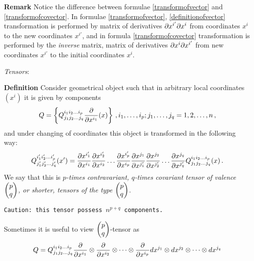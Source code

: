 \documentclass[12pt]{article}
\theoremstyle{theorem}
\numberwithin{equation}{section}
\begin{document}
{\bf Remark}  Notice the difference between formulae
\eqref{transformofvector} and \eqref{transformofcovector}.
In formulae \eqref{transformofvector}, \eqref{definitionofvector} 
transformation is performed
by matrix of derivatives ${\partial x^{i'}\partial x^i}$ from coordinates
    $x^i$ to the new coordinates $x^{i'}$, and
in formula \eqref{transformofcovector} transformation is performed
by the {\it inverse }matrix, matrix  of derivatives ${\partial x^{i}\partial x^{i'}}$ 
from new coordinates
    $x^{i'}$ to the initial coordinates $x^{i}$.

\m


          {\it Tensors}:




\smallskip

{\bf Definition}  
   Consider geometrical object
    such that in arbitrary local coordinates
   $(x^i)$
it is given by components
    $$
 Q=\left\{
    Q^{i_1i_2\dots i_p}_{j_1j_2\dots j_q}
      {\partial\over \partial x^{i_1}}(x)
        \right\}\,, i_1,\dots, i_p;j_1,\dots,j_q=1,2,\dots,n\,,
        $$
and under changing of coordinates this object is transformed in the following
way:
      \begin{equation}\label{ruleoftransformationofarbitrarytensors}
    Q^{i'_1i'_2\dots i'_p}_{j'_1j'_2\dots j'_q}(x')=
    {\partial x^{i'_1}\over \partial x^{i_1}}
    {\partial x^{i'_2}\over \partial x^{i_2}}
    \dots
    {\partial x^{i'_p}\over \partial x^{i_p}}
    {\partial x^{j_1}\over \partial x^{j'_1}}
    {\partial x^{j_2}\over \partial x^{j'_2}}
    \dots
    {\partial x^{j_q}\over \partial x^{j'_q}}
    Q^{i_1i_2\dots i_p}_{j_1j_2\dots j_q}(x)\,.
\end{equation}
We say that  this is
   {\it $p$-times contravariant, $q$-times covariant
tensor of valence $\begin{pmatrix} p\cr q\cr\end{pmatrix}$,
or shorter, 
 tensors of the type  $\begin{pmatrix} p\cr q\cr\end{pmatrix}$}.

{\tt Caution: this tensor possess $n^{p+q}$ components.}
 
\smallskip

Sometimes it is useful
to view  
 $\begin{pmatrix} p\cr q\cr\end{pmatrix}$-tensor as
       \begin{equation*}
 Q= Q^{i_1i_2\dots i_p}_{j_1j_2\dots j_q}
      {\partial\over \partial x^{i_1}}\otimes
      {\partial\over \partial x^{i_2}}\otimes\dots
      \otimes{\partial\over \partial x^{i_p}}
             dx^{j_1}\otimes
             dx^{j_2}\otimes\dots
             \otimes dx^{j_q}
          \end{equation*}       
\end{document}
